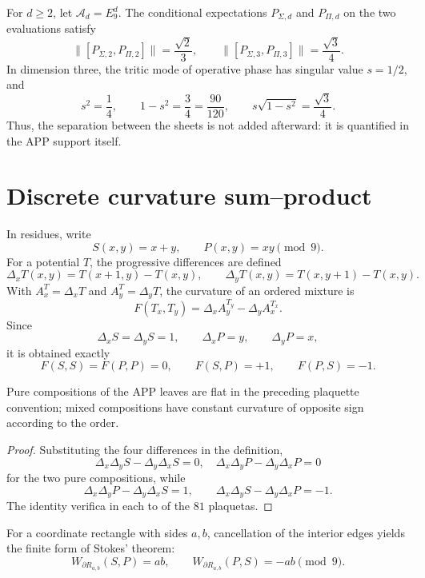 For \(d\ge2\), let \(\mathscr A_d=E_9^d\). The conditional expectations
\(P_{\Sigma,d}\) and \(P_{\Pi,d}\) on the two evaluations satisfy
\[
 \|[P_{\Sigma,2},P_{\Pi,2}]\|=\frac{\sqrt2}{3},
 \qquad
 \|[P_{\Sigma,3},P_{\Pi,3}]\|=\frac{\sqrt3}{4}.
\]
In dimension three, the tritic mode of operative phase has singular value
\(s=1/2\), and
\[
 s^2=\frac14,\qquad 1-s^2=\frac34=\frac{90}{120},
 \qquad s\sqrt{1-s^2}=\frac{\sqrt3}{4}.
\]
Thus, the separation between the sheets is not added afterward: it is quantified in
the APP support itself.

\section{Discrete curvature sum--product}

In residues, write
\[
 S(x,y)=x+y,\qquad P(x,y)=xy\pmod9.
\]
For a potential \(T\), the progressive differences are defined
\[
 \Delta_xT(x,y)=T(x+1,y)-T(x,y),\qquad
 \Delta_yT(x,y)=T(x,y+1)-T(x,y).
\]
With \(A_x^T=\Delta_xT\) and \(A_y^T=\Delta_yT\), the curvature of an ordered
mixture is
\[
 F(T_x,T_y)=\Delta_xA_y^{T_y}-\Delta_yA_x^{T_x}.
\]
Since
\[
 \Delta_xS=\Delta_yS=1,\qquad
 \Delta_xP=y,\qquad \Delta_yP=x,
\]
it is obtained exactly
\begin{equation}
 F(S,S)=F(P,P)=0,\qquad
 F(S,P)=+1,\qquad F(P,S)=-1.
 \label{espiral:eq:curvatura-mixta-app}
\end{equation}

\begin{theorem}
Pure compositions of the APP leaves are flat in the preceding
plaquette convention; mixed compositions have constant curvature of
opposite sign according to the order.
\end{theorem}
\begin{proof}
Substituting the four differences in the definition,
\[
 \Delta_x\Delta_yS-\Delta_y\Delta_xS=0,
 \quad
 \Delta_x\Delta_yP-\Delta_y\Delta_xP=0
\]
for the two pure compositions, while
\[
 \Delta_x\Delta_yP-\Delta_y\Delta_xS=1,
 \qquad
 \Delta_x\Delta_yS-\Delta_y\Delta_xP=-1.
\]
The identity  verifica in each to of the \(81\) plaquetas.
\end{proof}

For a coordinate rectangle with sides \(a,b\), cancellation of the
interior edges yields the finite form of Stokes' theorem:
\[
 W_{\partial R_{a,b}}(S,P)=ab,\qquad
 W_{\partial R_{a,b}}(P,S)=-ab\pmod9.
\]

